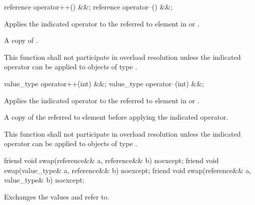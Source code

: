\begin{itemdecl}
reference operator++() &&;
reference operator--() &&;
\end{itemdecl}
\begin{itemdescr}
  \pnum\effects Applies the indicated operator to the referred to element in \simd or \mask.

  \pnum\returns A copy of .

  \pnum\remarks This function shall not participate in overload resolution unless the indicated operator can be applied to objects of type .%
\end{itemdescr}

\begin{itemdecl}
value_type operator++(int) &&;
value_type operator--(int) &&;
\end{itemdecl}
\begin{itemdescr}
  \pnum\effects Applies the indicated operator to the referred to element in \simd or \mask.

  \pnum\returns A copy of the referred to element before applying the indicated operator.

  \pnum\remarks This function shall not participate in overload resolution unless the indicated operator can be applied to objects of type .%
\end{itemdescr}

\begin{itemdecl}
friend void swap(reference&& a, reference&& b) noexcept;
friend void swap(value_type& a, reference&& b) noexcept;
friend void swap(reference&& a, value_type& b) noexcept;
\end{itemdecl}
\begin{itemdescr}
  \pnum\effects Exchanges the values  and  refer to.
\end{itemdescr}

